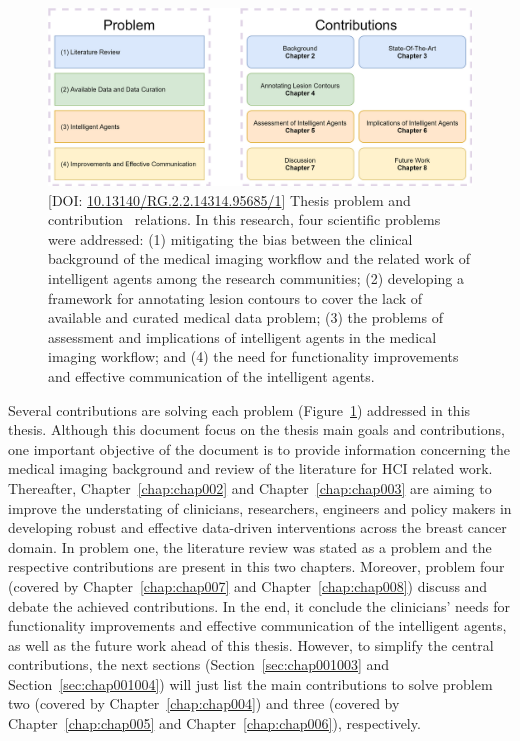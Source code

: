 \begin{figure}[ht]
\centering
\includegraphics[width=\textwidth]{images/fig017}
\caption{[DOI: \protect\href{https://www.doi.org/10.13140/RG.2.2.14314.95685/1}{10.13140/RG.2.2.14314.95685/1}] Thesis problem and contribution~\cite{https://doi.org/10.13140/rg.2.2.14314.95685/1} relations. In this research, four scientific problems were addressed: (1) mitigating the bias between the clinical background of the medical imaging workflow and the related work of intelligent agents among the research communities; (2) developing a framework for annotating lesion contours to cover the lack of available and curated medical data problem; (3) the problems of assessment and implications of intelligent agents in the medical imaging workflow; and (4) the need for functionality improvements and effective communication of the intelligent agents.}
\label{fig:fig017}
\end{figure}

Several contributions are solving each problem (Figure~\ref{fig:fig017}) addressed in this thesis.
Although this document focus on the thesis main goals and contributions, one important objective of the document is to provide information concerning the medical imaging background and review of the literature for \ac{HCI} related work.
Thereafter, Chapter~\ref{chap:chap002} and Chapter~\ref{chap:chap003} are aiming to improve the understating of clinicians, researchers, engineers and policy makers in developing robust and effective data-driven interventions across the breast cancer domain.
In problem one, the literature review was stated as a problem and the respective contributions are present in this two chapters.
Moreover, problem four (covered by Chapter~\ref{chap:chap007} and Chapter~\ref{chap:chap008}) discuss and debate the achieved contributions.
In the end, it conclude the clinicians' needs for functionality improvements and effective communication of the intelligent agents, as well as the future work ahead of this thesis.
However, to simplify the central contributions, the next sections (Section~\ref{sec:chap001003} and Section~\ref{sec:chap001004}) will just list the main contributions to solve problem two (covered by Chapter~\ref{chap:chap004}) and three (covered by Chapter~\ref{chap:chap005} and Chapter~\ref{chap:chap006}), respectively.

